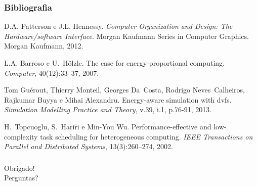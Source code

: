 \documentclass{beamer}
\begin{document}
\begin{frame}
\frametitle{Bibliografia}


\begin{thebibliography}{99}
	D.A. Patterson e J.L. Hennessy. {\em Computer Organization and Design: The Hardware/software
	  Interface}. Morgan Kaufmann Series in Computer Graphics. Morgan Kaufmann, 2012.

	L.A. Barroso e U.~H\"olzle.
	The case for energy-proportional computing.
	{\em Computer}, 40(12):33--37, 2007.

	Tom Gu{\'e}rout, Thierry Monteil, Georges Da~Costa, Rodrigo Neves~Calheiros,
	  Rajkumar Buyya e Mihai Alexandru.
	Energy-aware simulation with dvfs.
	{\em Simulation Modelling Practice and Theory}, v.39, i.1, p.76-91, 2013.

	H.~Topcuoglu, S.~Hariri e Min-You Wu.
	Performance-effective and low-complexity task scheduling for
	  heterogeneous computing.
	{\em IEEE Transactions on Parallel and Distributed Systems},
	  13(3):260--274, 2002.

\end{thebibliography}

\end{frame}

\begin{frame}
\frametitle{}

\begin{center}
	\Huge Obrigado! \\
	\Large Perguntas?
\end{center}

\end{frame}

\begin{frame}
	\titlepage
\end{frame}

\appendix
\end{document}
